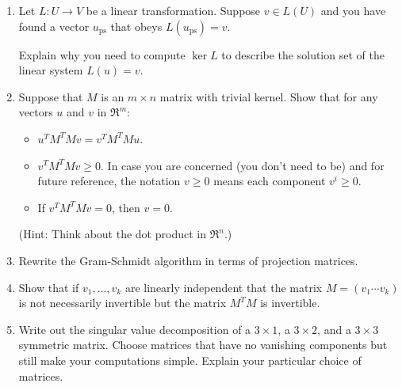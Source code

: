 
\begin{enumerate}
\item \label{kernalsolspaceprob} Let $L:U\rightarrow V$ be a linear transformation.  Suppose $v\in L(U)$ and you have found a vector $u_{\mathrm{ps}}$ that obeys $L(u_{\mathrm{ps}})=v$.

Explain why you need to compute $\ker L$ to describe the solution 
set %
of the linear system $L(u)=v$.


\item \label{problem:ls_prob2} Suppose that $M$ is an $m\times n$ matrix with trivial kernel.  Show that for any vectors $u$ and $v$ in $\Re^m$:
\begin{itemize}
\item $u^TM^TMv = v^TM^TMu$.
\item $v^TM^TMv \geq 0$. In case you are concerned (you don't need to be) and for future reference, the notation $v \geq 0$ means each component $v^i \geq 0$.
\item If $v^TM^TMv=0$, then $v=0$.
\end{itemize}
(Hint: Think about the dot product in $\Re^n$.)




\item Rewrite the Gram-Schmidt algorithm in terms of projection matrices. 

\item Show that if $v_1,\dots, v_k$ are linearly independent that  the matrix 
$M=(v_1 \cdots v_k)$ is not necessarily invertible but  the matrix $M^TM$ is invertible. 

\item Write out the singular value decomposition of a $3\times 1$, a $3\times 2$, and a $3\times 3$ symmetric matrix. 
Choose matrices that have no vanishing components but still make your computations simple. Explain your particular choice of matrices.


\end{enumerate}
